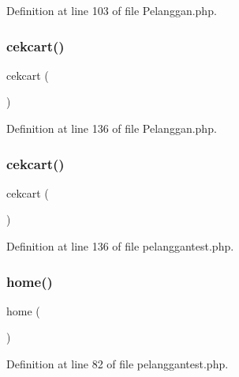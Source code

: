 Definition at line 103 of file Pelanggan.\+php.

\mbox{\label{class_pelanggan_a4fe1079bf267b3b43db2d67e1c437e25}} 
\subsubsection{\texorpdfstring{cekcart()}{cekcart()}\hspace{0.1cm}{\footnotesize\ttfamily [1/2]}}
{\footnotesize\ttfamily cekcart (\begin{DoxyParamCaption}{ }\end{DoxyParamCaption})}



Definition at line 136 of file Pelanggan.\+php.

\mbox{\label{class_pelanggan_a4fe1079bf267b3b43db2d67e1c437e25}} 
\subsubsection{\texorpdfstring{cekcart()}{cekcart()}\hspace{0.1cm}{\footnotesize\ttfamily [2/2]}}
{\footnotesize\ttfamily cekcart (\begin{DoxyParamCaption}{ }\end{DoxyParamCaption})}



Definition at line 136 of file pelanggantest.\+php.

\mbox{\label{class_pelanggan_a174b8e4c7d4d7363c6f773671defdeff}} 
\subsubsection{\texorpdfstring{home()}{home()}\hspace{0.1cm}{\footnotesize\ttfamily [1/2]}}
{\footnotesize\ttfamily home (\begin{DoxyParamCaption}{ }\end{DoxyParamCaption})}



Definition at line 82 of file pelanggantest.\+php.

